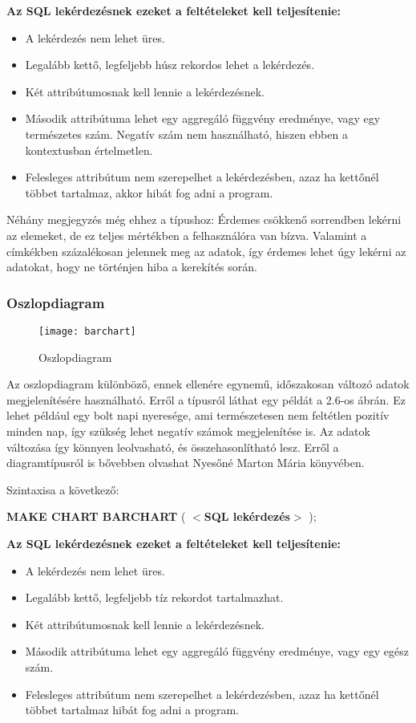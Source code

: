 \textbf{Az SQL lekérdezésnek ezeket a feltételeket kell teljesítenie:}
\begin{itemize}
  \item A lekérdezés nem lehet üres.
  \item Legalább kettő, legfeljebb húsz rekordos lehet a lekérdezés.
  \item Két attribútumosnak kell lennie a lekérdezésnek.
  \item Második attribútuma lehet egy aggregáló függvény eredménye, vagy egy természetes szám. 
  Negatív szám nem használható, hiszen ebben a kontextusban értelmetlen.
  \item Felesleges attribútum nem szerepelhet a lekérdezésben, azaz ha kettőnél többet tartalmaz, akkor hibát fog adni a program.
\end{itemize}

Néhány megjegyzés még ehhez a típushoz:
Érdemes csökkenő sorrendben lekérni az elemeket, de ez teljes mértékben a felhasználóra van bízva. Valamint a címkékben százalékosan jelennek meg az adatok, így érdemes lehet úgy lekérni az adatokat, hogy ne történjen hiba
a kerekítés során.
\newpage
\subsubsection{Oszlopdiagram}
\begin{figure}[ht]
  \begin{center}
    \texttt{[image: barchart]}
  \end{center}
 \caption{Oszlopdiagram}
\end{figure}

Az oszlopdiagram különböző, ennek ellenére egynemű, időszakosan változó adatok megjelenítésére használható. Erről a típusról láthat egy példát a
2.6-os ábrán. Ez lehet például egy
bolt napi nyeresége, ami természetesen nem feltétlen pozitív minden nap, így szükség lehet negatív számok megjelenítése is. Az adatok
változása így könnyen leolvasható, és összehasonlítható lesz. Erről a diagramtípusról is bővebben olvashat Nyesőné Marton Mária
könyvében\cite{szamadat}.

Szintaxisa a következő:

\textbf{{\color{awesomeblue} MAKE CHART BARCHART }} ( \textbf{$<$SQL lekérdezés$>$} );

\textbf{Az SQL lekérdezésnek ezeket a feltételeket kell teljesítenie:}
\begin{itemize}
  \item A lekérdezés nem lehet üres.
  \item Legalább kettő, legfeljebb tíz rekordot tartalmazhat.
  \item Két attribútumosnak kell lennie a lekérdezésnek.
  \item Második attribútuma lehet egy aggregáló függvény eredménye, vagy egy egész szám.
  \item Felesleges attribútum nem szerepelhet a lekérdezésben, azaz ha kettőnél többet tartalmaz hibát fog adni a program.
\end{itemize}


